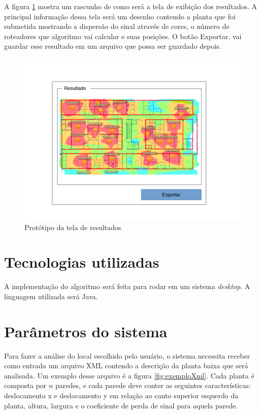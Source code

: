 \documentclass[tc,twoside]{iiufrgs}
\begin{document}
A figura \ref{fig:prototipoTres} mostra um rascunho de como será a tela de exibição dos resultados. A principal informação dessa tela será um desenho contendo a planta que foi submetida mostrando a dispersão do sinal através de cores, o número de roteadores que algoritmo vai calcular e suas posições. O botão Exportar, vai guardar esse resultado em um arquivo que possa ser guardado depois. 

\begin{figure}[!h]
	\centering
	\includegraphics[scale=0.4]{img/prototipo3.png}
	\caption{Protótipo da tela de resultados}
	\label{fig:prototipoTres}
\end{figure}


\section{Tecnologias utilizadas}

A implementação do algoritmo será feita para rodar em um sistema \textit{desktop}. A linguagem utilizada será Java.

\section{Parâmetros do sistema}

Para fazer a análise do local escolhido pelo usuário, o sistema necessita receber como entrada um arquivo XML contendo a descrição da planta baixa que será analisada. Um exemplo desse arquivo é a figura \ref{fig:exemploXml}. Cada planta é composta por $n$ paredes, e cada parede deve conter as seguintes características: deslocamento x e deslocamento y em relação ao canto superior esquerdo da planta, altura, largura e o coeficiente de perda de sinal para aquela parede. 
\end{document}
